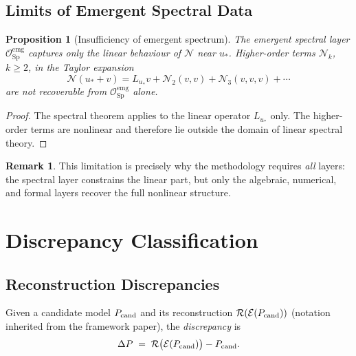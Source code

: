 \documentclass[11pt,a4paper]{article}
\theoremstyle{definition}
\newtheorem{remark}[definition]{Remark}
\theoremstyle{plain}
\newtheorem{proposition}[definition]{Proposition}
\newcommand{\Sp}{\mathrm{Sp}}
\newcommand{\Ecal}{\mathcal{E}}
\newcommand{\Ocal}{\mathcal{O}}
\newcommand{\Ncal}{\mathcal{N}}
\newcommand{\Rcal}{\mathcal{R}}
\begin{document}
\subsection{Limits of Emergent Spectral Data}

\begin{proposition}[Insufficiency of emergent spectrum]\label{prop:insufficient}
The emergent spectral layer $\Ocal_\Sp^{\mathrm{emg}}$ captures only
the \emph{linear} behaviour of $\Ncal$ near $u_\ast$. Higher-order
terms $\Ncal_k$, $k \geq 2$, in the Taylor expansion
\[
  \Ncal(u_\ast + v)
  =
  L_{u_\ast} v + \Ncal_2(v, v) + \Ncal_3(v, v, v) + \cdots
\]
are not recoverable from $\Ocal_\Sp^{\mathrm{emg}}$ alone.
\end{proposition}

\begin{proof}
The spectral theorem applies to the linear operator $L_{u_\ast}$
only. The higher-order terms are nonlinear and therefore lie outside
the domain of linear spectral theory.
\end{proof}

\begin{remark}
This limitation is precisely why the methodology requires
\emph{all} layers: the spectral layer constrains the linear part,
but only the algebraic, numerical, and formal layers recover the
full nonlinear structure.
\end{remark}

\section{Discrepancy Classification}
\label{sec:discrepancy}

\subsection{Reconstruction Discrepancies}

Given a candidate model $P_{\rm cand}$ and its reconstruction
$\Rcal(\Ecal(P_{\rm cand}))$ (notation inherited from the framework
paper), the \emph{discrepancy} is
\[
  \Delta P
  \;=\;
  \Rcal\bigl(\Ecal(P_{\rm cand})\bigr) - P_{\rm cand}.
\]
\end{document}
